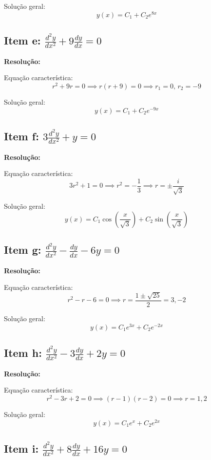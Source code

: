 \documentclass[12pt,a4paper]{article}
\begin{document}
Solução geral:
\[
\boxed{y(x) = C_1 + C_2 e^{8x}}
\]

\subsection*{Item e: \(\frac{d^2 y}{dx^2} + 9 \frac{dy}{dx} = 0\)}

\textbf{Resolução:}

Equação característica:
\[
r^2 + 9r = 0 \implies r(r + 9) = 0 \implies r_1 = 0, \, r_2 = -9
\]

Solução geral:
\[
\boxed{y(x) = C_1 + C_2 e^{-9x}}
\]

\subsection*{Item f: \(3 \frac{d^2 y}{dx^2} + y = 0\)}

\textbf{Resolução:}

Equação característica:
\[
3r^2 + 1 = 0 \implies r^2 = -\frac{1}{3} \implies r = \pm \frac{i}{\sqrt{3}}
\]

Solução geral:
\[
\boxed{y(x) = C_1 \cos\left(\frac{x}{\sqrt{3}}\right) + C_2 \sin\left(\frac{x}{\sqrt{3}}\right)}
\]

\subsection*{Item g: \(\frac{d^2 y}{dx^2} - \frac{dy}{dx} - 6y = 0\)}

\textbf{Resolução:}

Equação característica:
\[
r^2 - r - 6 = 0 \implies r = \frac{1 \pm \sqrt{25}}{2} = 3, -2
\]

Solução geral:
\[
\boxed{y(x) = C_1 e^{3x} + C_2 e^{-2x}}
\]

\subsection*{Item h: \(\frac{d^2 y}{dx^2} - 3 \frac{dy}{dx} + 2y = 0\)}

\textbf{Resolução:}

Equação característica:
\[
r^2 - 3r + 2 = 0 \implies (r-1)(r-2) = 0 \implies r = 1, 2
\]

Solução geral:
\[
\boxed{y(x) = C_1 e^{x} + C_2 e^{2x}}
\]

\subsection*{Item i: \(\frac{d^2 y}{dx^2} + 8 \frac{dy}{dx} + 16y = 0\)}
\end{document}
